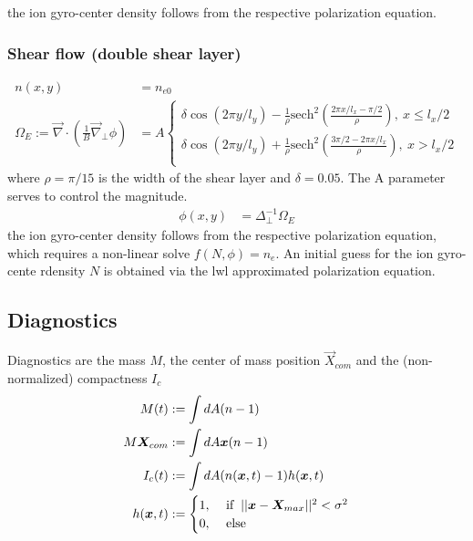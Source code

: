 the ion gyro-center density follows from the respective polarization equation.

\subsubsection{Shear flow (double shear layer)}
\begin{align}
 n(x,y) &= n_{e0}\\
    \Omega_E:= \vec{\nabla} \cdot \left(\frac{1}{B} \vec{\nabla}_\perp \phi\right) &= A
    \begin{cases}
        \delta \cos(2 \pi y/l_y) - \frac{1}{\rho} \text{sech}^2 \left(\frac{2 \pi x/l_x-\pi/2}{\rho}\right),\ x \leq l_x/2 \\
        \delta \cos(2 \pi y/l_y) + \frac{1}{\rho} \text{sech}^2 \left(\frac{3 \pi /2-2 \pi x/l_x}{\rho}\right),\ x > l_x/2 \\
    \end{cases}
\end{align}
where \(\rho=\pi/15\) is the width of the shear layer and \(\delta=0.05\). The A parameter serves to control the magnitude.
\begin{align}
  \phi(x,y) &= \Delta_\perp^{-1} \Omega_E
\end{align}
the ion gyro-center density follows from the respective polarization equation, which requires a non-linear solve \(f(N,\phi) = n_e\). An initial guess for the ion gyro-cente rdensity \(N\) is obtained via the lwl approximated polarization equation.

\subsection{Diagnostics}
Diagnostics are the mass \(M\), the center of mass position \(\vec{X}_{com}\) and the (non-normalized) compactness \(I_c\)
\begin{align}
    M(t) &:= \int dA (n-1)  \\
    M \vec{X}_{com} &:= \int dA \vec{x} (n-1) \\
    I_c(t)  &:= \int dA (n(\vec{x},t)-1) h(\vec{x},t) \\
    h(\vec{x},t) &:= \begin{cases}
          1, 
        &\ \text{if} \hspace{2mm}||\vec{x} - \vec{X}_{max}||^2 < \sigma^2 \\
0,  &\ \text{else} 
           \end{cases}
\end{align}
